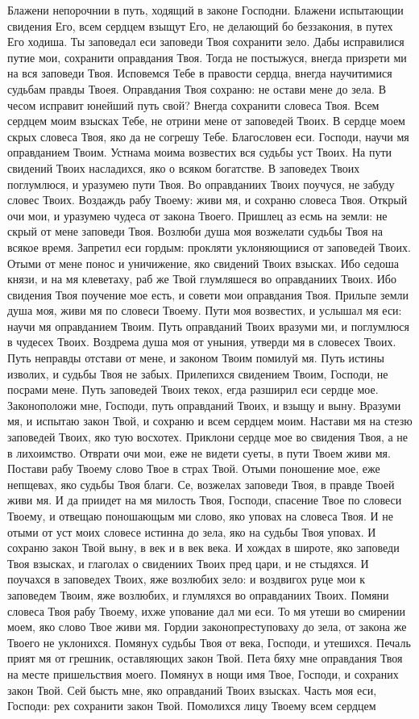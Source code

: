 Блажени непорочнии в путь, ходящий в законе Господни. Блажени испытающии свидения Его, всем сердцем взыщут Его, не делающий бо беззакония, в путех Его ходиша. Ты заповедал еси заповеди Твоя сохранити зело. Дабы исправилися путие мои, сохранити оправдания Твоя. Тогда не постыжуся, внегда призрети ми на вся заповеди Твоя. Исповемся Тебе в правости сердца, внегда научитимися судьбам правды Твоея. Оправдания Твоя сохраню: не остави мене до зела. В чесом исправит юнейший путь свой? Внегда сохранити словеса Твоя. Всем сердцем моим взысках Тебе, не отрини мене от заповедей Твоих. В сердце моем скрых словеса Твоя, яко да не согрешу Тебе. Благословен еси. Господи, научи мя оправданием Твоим. Устнама моима возвестих вся судьбы уст Твоих. На пути свидений Твоих насладихся, яко о всяком богатстве. В заповедех Твоих поглумлюся, и уразумею пути Твоя. Во оправданиих Твоих поучуся, не забуду словес Твоих. Воздаждь рабу Твоему: живи мя, и сохраню словеса Твоя. Открый очи мои, и уразумею чудеса от закона Твоего. Пришлец аз есмь на земли: не скрый от мене заповеди Твоя. Возлюби душа моя возжелати судьбы Твоя на всякое время. Запретил еси гордым: прокляти уклоняющиися от заповедей Твоих. Отыми от мене понос и уничижение, яко свидений Твоих взысках. Ибо седоша князи, и на мя клеветаху, раб же Твой глумляшеся во оправданиих Твоих. Ибо свидения Твоя поучение мое есть, и совети мои оправдания Твоя. Прильпе земли душа моя, живи мя по словеси Твоему. Пути моя возвестих, и услышал мя еси: научи мя оправданием Твоим. Путь оправданий Твоих вразуми ми, и поглумлюся в чудесех Твоих. Воздрема душа моя от уныния, утверди мя в словесех Твоих. Путь неправды отстави от мене, и законом Твоим помилуй мя. Путь истины изволих, и судьбы Твоя не забых. Прилепихся свидением Твоим, Господи, не посрами мене. Путь заповедей Твоих текох, егда разширил еси сердце мое. Законоположи мне, Господи, путь оправданий Твоих, и взыщу и выну. Вразуми мя, и испытаю закон Твой, и сохраню и всем сердцем моим. Настави мя на стезю заповедей Твоих, яко тую восхотех. Приклони сердце мое во свидения Твоя, а не в лихоимство. Отврати очи мои, еже не видети суеты, в пути Твоем живи мя. Постави рабу Твоему слово Твое в страх Твой. Отыми поношение мое, еже непщевах, яко судьбы Твоя благи. Се, возжелах заповеди Твоя, в правде Твоей живи мя. И да приидет на мя милость Твоя, Господи, спасение Твое по словеси Твоему, и отвещаю поношающым ми слово, яко уповах на словеса Твоя. И не отыми от уст моих словесе истинна до зела, яко на судьбы Твоя уповах. И сохраню закон Твой выну, в век и в век века. И хождах в широте, яко заповеди Твоя взысках, и глаголах о свидениих Твоих пред цари, и не стыдяхся. И поучахся в заповедех Твоих, яже возлюбих зело: и воздвигох руце мои к заповедем Твоим, яже возлюбих, и глумляхся во оправданиих Твоих. Помяни словеса Твоя рабу Твоему, ихже упование дал ми еси. То мя утеши во смирении моем, яко слово Твое живи мя. Гордии законопреступоваху до зела, от закона же Твоего не уклонихся. Помянух судьбы Твоя от века, Господи, и утешихся. Печаль прият мя от грешник, оставляющих закон Твой. Пета бяху мне оправдания Твоя на месте пришельствия моего. Помянух в нощи имя Твое, Господи, и сохраних закон Твой. Сей бысть мне, яко оправданий Твоих взысках. Часть моя еси, Господи: рех сохранити закон Твой. Помолихся лицу Твоему всем сердцем 
